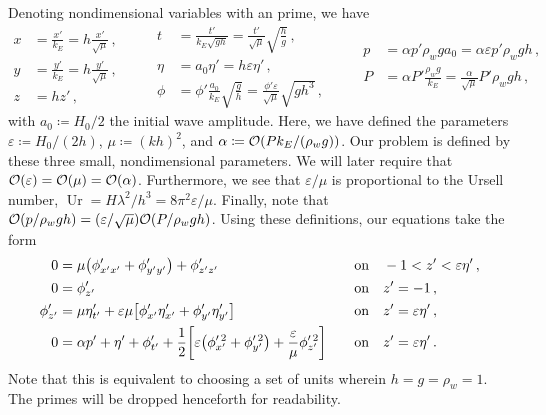 \documentclass{jfm}
\DeclareMathOperator{\Ur}{Ur}
\renewcommand*{\epsilon}{\varepsilon}
\begin{document}
Denoting nondimensional variables with an prime, we have
\begin{equation*}
  \begin{aligned}
  x &= \frac{x'}{k_E} = h \frac{x'}{\sqrt{\mu}}\,, \\
  y &= \frac{y'}{k_E} = h \frac{y'}{\sqrt{\mu}}\,, \\
  z &= h z' \,,
  \end{aligned}
  \qquad
  \begin{aligned}
  t &= \frac{t'}{k_E\sqrt{g h}}
    = \frac{t'}{\sqrt{\mu}} \sqrt{\frac{h}{g}} \,, \\
  \eta &= a_0 \eta' = h \epsilon \eta' \,, \\
  \phi &= \phi'\frac{a_0}{k_E}\sqrt{\frac{g}{h}}
    = \frac{\phi'\epsilon}{\sqrt{\mu}}\sqrt{g h^3} \,,
  \end{aligned}
  \qquad
  \begin{aligned}
  p &= \alpha p' \rho_w g a_0
    = \alpha \epsilon p' \rho_w g h \,, \\
  P &= \alpha P' \frac{\rho_w g}{k_E}
    = \frac{\alpha}{\sqrt{\mu}} P' \rho_w g h \,,
  \end{aligned}
\end{equation*}
with $a_0 \coloneqq H_0/2$ the initial wave amplitude.
Here, we have defined the parameters $\epsilon \coloneqq H_0/(2h)$, $\mu
\coloneqq (kh)^2$, and $\alpha \coloneqq \order{P k_E/(\rho_w g)}$.
Our problem is defined by these three small, nondimensional parameters.
We will later require that $\order{\epsilon} = \order{\mu} =
\order{\alpha}$.
Furthermore, we see that $\epsilon/\mu$ is proportional to the Ursell
number, $\Ur = H \lambda^2/h^3 = 8 \pi^2 \epsilon/\mu$.
Finally, note that $\order{p/\rho_w g h} = (\epsilon/\sqrt{\mu})
\order{P/\rho_w g h}$.
Using these definitions, our equations take the form
\begin{alignat}{2}
  0 &= \mu \pqty{\phi'_{x'x'} + \phi'_{y'y'}} + \phi'_{z'z'} &&\qq{on}
    -1 < z' < \epsilon \eta' \,, \label{eq:laplace_nondim} \\
  0 &= \phi'_{z'} &&\qq{on} z'=-1 \,, \label{eq:bottom_bc_nondim} \\
  \phi'_{z'} &= \mu \eta'_{t'} +
    \epsilon \mu \bqty{\phi'_{x'} \eta'_{x'} + \phi'_{y'} \eta'_{y'}}
    &&\qq{on} z' = \epsilon \eta' \,, \label{eq:kinematic_bc_nondim} \\
  0 &= \alpha p' +  \eta' + \phi'_{t'} + \frac{1}{2}
    \bqty{\epsilon \pqty{\phi_{x'}^{\prime \, 2} + \phi_{y'}^{\prime \,
    2}} +  \frac{\epsilon}{\mu} \phi_{z'}^{\prime \, 2}} &&\qq{on} z'=
    \epsilon \eta' \,.  \label{eq:dynamic_bc_nondim}
\end{alignat}
Note that this is equivalent to choosing a set of units wherein $h = g =
\rho_w = 1$.
The primes will be dropped henceforth for readability.
\end{document}
